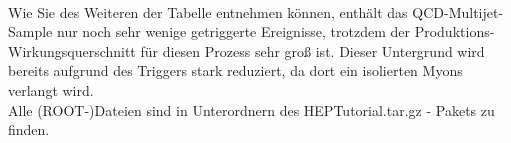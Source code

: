\\Wie Sie des Weiteren der Tabelle entnehmen k\"onnen, enth\"alt das QCD-Multijet-Sample nur noch sehr wenige getriggerte Ereignisse, trotzdem der Produktions-Wirkungsquerschnitt f\"ur diesen Prozess sehr gro\ss{} ist. Dieser Untergrund wird bereits aufgrund des Triggers stark reduziert, da dort ein isolierten Myons verlangt wird.\\
Alle (ROOT-)Dateien sind in Unterordnern des HEPTutorial.tar.gz - Pakets zu finden.